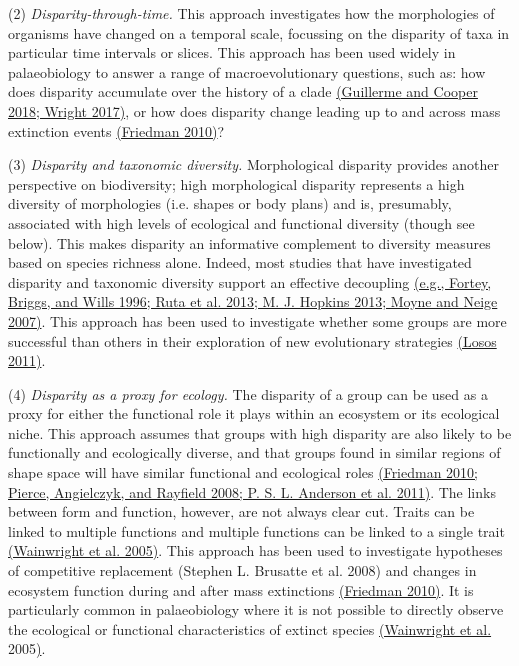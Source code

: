 (2) \emph{Disparity-through-time.} This approach investigates how the
morphologies of organisms have changed on a temporal scale, focussing on
the disparity of taxa in particular time intervals or slices. This
approach has been used widely in palaeobiology to answer a range of
macroevolutionary questions, such as: how does disparity accumulate over
the history of a clade
\href{https://paperpile.com/c/sTGYvp/ekU4+s33b}{(Guillerme and Cooper
2018; Wright 2017)}, or how does disparity change leading up to and
across mass extinction events
\href{https://paperpile.com/c/sTGYvp/EETc}{(Friedman 2010)}?

(3) \emph{Disparity and taxonomic diversity.} Morphological disparity
provides another perspective on biodiversity; high morphological
disparity represents a high diversity of morphologies (i.e. shapes or
body plans) and is, presumably, associated with high levels of
ecological and functional diversity (though see below). This makes
disparity an informative complement to diversity measures based on
species richness alone. Indeed, most studies that have investigated
disparity and taxonomic diversity support an effective decoupling
\href{https://paperpile.com/c/sTGYvp/2tbJ+geAO+hea5+aVVj}{(e.g., Fortey,
Briggs, and Wills 1996; Ruta et al. 2013; M. J. Hopkins 2013; Moyne and
Neige 2007)}. This approach has been used to investigate whether some
groups are more successful than others in their exploration of new
evolutionary strategies
\href{https://paperpile.com/c/sTGYvp/dJHu}{(Losos 2011)}.

(4) \emph{Disparity as a proxy for ecology.} The disparity of a group
can be used as a proxy for either the functional role it plays within an
ecosystem or its ecological niche. This approach assumes that groups
with high disparity are also likely to be functionally and ecologically
diverse, and that groups found in similar regions of shape space will
have similar functional and ecological roles
\href{https://paperpile.com/c/sTGYvp/EETc+tSIy+qjj9}{(Friedman 2010;
Pierce, Angielczyk, and Rayfield 2008; P. S. L. Anderson et al. 2011)}.
The links between form and function, however, are not always clear cut.
Traits can be linked to multiple functions and multiple functions can be
linked to a single trait
\href{https://paperpile.com/c/sTGYvp/Ejzr}{(Wainwright et al. 2005)}.
This approach has been used to investigate hypotheses of competitive
replacement (Stephen L. Brusatte et al. 2008) and changes in ecosystem
function during and after mass extinctions
\href{https://paperpile.com/c/sTGYvp/EETc}{(Friedman 2010)}. It is
particularly common in palaeobiology where it is not possible to
directly observe the ecological or functional characteristics of extinct
species \href{https://paperpile.com/c/sTGYvp/Ejzr}{(Wainwright et al.}
2005\href{https://paperpile.com/c/sTGYvp/Ejzr}{)}.

